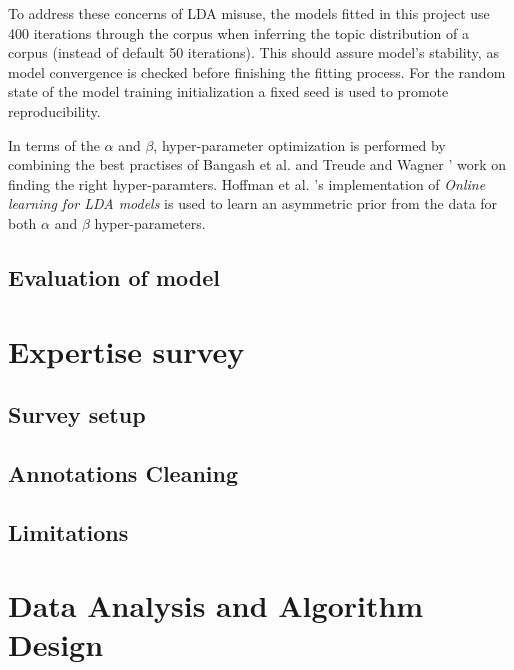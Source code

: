     To address these concerns of LDA misuse, the models fitted in this project use 400 iterations through the corpus when inferring the topic distribution of a corpus (instead of default 50 iterations). This should assure model's stability, as model convergence is checked before finishing the fitting process. For the random state of the model training initialization a fixed seed is used to promote reproducibility. 
    
    In terms of the $\alpha$ and $\beta$, hyper-parameter optimization is performed by combining the best practises of Bangash et al. \cite{bangash2019developers} and Treude and Wagner \cite{treude2019predicting}' work on finding the right hyper-paramters. Hoffman et al. \cite{hoffman2010online}'s implementation of \textit{Online learning for LDA models} is used to learn an asymmetric prior from the data for both $\alpha$ and $\beta$  hyper-parameters.
    

    
    
    \subsection{Evaluation of model}
    
    \section{Expertise survey}
        \subsection{Survey setup}
        \subsection{Annotations Cleaning}
        \subsection{Limitations}
        
\section{Data Analysis and Algorithm Design}
    
